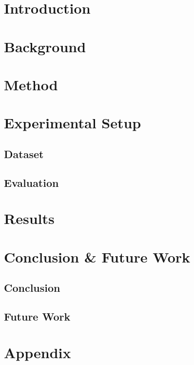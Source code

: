 \documentclass{report}
\begin{document}


\begin{abstract}

\end{abstract}

\renewcommand{\abstractname}{Acknowledgements}
\begin{abstract}

\end{abstract}

\tableofcontents

\chapter{Introduction}


\chapter{Background}


\chapter{Method}
\chapter{Experimental Setup}
\section{Dataset}
\section{Evaluation}

\chapter{Results}

\chapter{Conclusion \& Future Work}
\section{Conclusion}
\section{Future Work}






\chapter*{Appendix}
\end{document}
